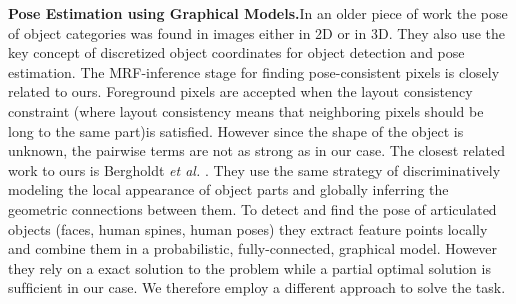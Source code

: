 \documentclass[10pt,twocolumn,a4paper]{article}
\begin{document}
     \textbf{Pose Estimation using Graphical Models.}In an older piece of work
     the pose of object categories was found in images either in 2D or in 3D.
     They also use the key concept of discretized object coordinates for object
      detection and pose estimation. The MRF-inference stage for ﬁnding
      pose-consistent pixels is closely related to ours. Foreground pixels are
      accepted when the layout consistency constraint (where layout consistency
      means that neighboring pixels should be long to the same part)is satisﬁed.
      However since the shape of the object is unknown, the pairwise terms are
      not as strong as in our case. The closest related work to ours is Bergholdt
      \emph{et al.} \cite{c5}. They use the same strategy of discriminatively
      modeling the local appearance of object parts and globally inferring the
       geometric connections between them. To detect and ﬁnd the pose of
       articulated objects (faces, human spines, human poses) they extract
       feature points locally and combine them in a probabilistic,
       fully-connected, graphical model. However they rely on a exact solution to the problem
       while a partial optimal solution is sufﬁcient in our case.
       We therefore employ a different approach to solve the task.


     
     
      
\end{document}
